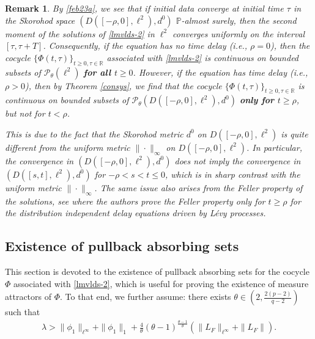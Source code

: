 \documentclass[11pt]{article}
\numberwithin{equation}{section}
\theoremstyle{plain}
\newtheorem{remark}{Remark}[section]
\begin{document}
\begin{remark} \label{contskorohod}
  By  \eqref{feb23a},
  we see that 
  if     initial data
  converge
  at initial time
  $\tau$  in
  the  Skorohod 
  space
  $(D([-\rho, 0], \ell^2), d^0)$
    $\mathbb{P}$-almost surely,
    then the second moment
    of the solutions
    of \eqref{lmvlds-2}
    in $\ell^2$
    converges 
   uniformly on the interval
   $[\tau, \tau +T]$.
   Consequently,
   if the equation has no time delay
   (i.e.,  $\rho = 0$), 
  then the cocycle $\{ \Phi(t,\tau) \}_{t \ge 0, \tau \in \mathbb{R}}$ associated with \eqref{lmvlds-2} is continuous on bounded subsets of $\mathcal{P}_{\theta}(\ell^2)$ 
  {\bf for  all $t \ge 0$}. 
  However, 
  if the equation has time delay
  (i.e.,  $\rho > 0$), 
  then by 
   Theorem \ref{consys},
   we find that
     the cocycle $\{ \Phi(t,\tau) \}_{t \ge 0, \tau \in \mathbb{R}}$ is continuous on bounded subsets of $\mathcal{P}_{\theta}
     (D([-\rho, 0], \ell^2), d^0)
     $ 
     {\bf only for $t \ge \rho$}, but not for $t<\rho$.
     
     
     
     This is due to the fact that
     the  Skorohod metric
     $d^0$ on
      $ D([-\rho, 0], \ell^2)$
      is quite different from
      the 
      uniform metric  $\|\cdot\|_\infty$
      on  $ D([-\rho, 0], \ell^2)$.
      In particular,
        the convergence in $
        (D([-\rho, 0], \ell^2), d^0)$ does not imply the convergence in 
        $(D([s, t], \ell^2), d^0)$ for $-\rho < s < t \le 0$,
        which is in sharp contrast
        with the uniform metric $\|\cdot\|_\infty$.
        The same issue also arises
        from the Feller property
        of the solutions, see   \cite{RRG2006SPA}
        where
        the authors prove the
        Feller property
        only for $t\ge  \rho$
         for
         the  distribution independent delay   equations driven by L\'{e}vy processes.
 \end{remark}


 \subsection{Existence of pullback absorbing sets}

 This section is devoted to the existence of pullback absorbing sets for the cocycle $\Phi$ associated with \eqref{lmvlds-2}, which is useful for proving the existence of 
 measure attractors  of $\Phi$.
 To that end, we  further assume:
 there exists $ \theta \in \left(2, \tfrac{2(p-2)}{q-2} \right) $
 such that 
 \begin{align}\label{dissip1}
    \lambda 
     > \|\phi_1\|_{\ell^\infty}
   	     +  \|\phi_1\|_{1}
   	     + { \frac{4}{\theta} 
   	             (\theta-1)^{\frac{\theta - 1}{\theta} }   }
   	          	            \left( \|L_{F}\|_{\ell^\infty} + \|L_F\|
   	          	            \right).
 \end{align}
 
\end{document}
